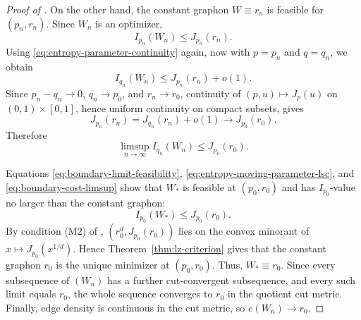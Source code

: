 \begin{proof}[Proof of ]
On the other hand, the constant graphon $W\equiv r_n$ is feasible for
$(p_n,r_n)$.  Since $W_n$ is an optimizer,
\[
  I_{p_n}(W_n)\le J_{p_n}(r_n).
\]
Using \eqref{eq:entropy-parameter-continuity} again, now with $p=p_n$ and $q=q_n$,
we obtain
\[
  I_{q_n}(W_n)
  \le
  J_{p_n}(r_n)+o(1).
\]
Since $p_n-q_n\to0$, $q_n\to p_0$, and $r_n\to r_0$, continuity of
$(p,u)\mapsto J_p(u)$ on $(0,1)\times[0,1]$, hence uniform continuity on
compact subsets, gives
\[
  J_{p_n}(r_n)=J_{q_n}(r_n)+o(1)\to J_{p_0}(r_0).
\]
Therefore
\begin{equation}\label{eq:boundary-cost-limsup}
  \limsup_{n\to\infty} I_{q_n}(W_n)
  \le
  J_{p_0}(r_0).
\end{equation}

Equations \eqref{eq:boundary-limit-feasibility}, \eqref{eq:entropy-moving-parameter-lsc}, and \eqref{eq:boundary-cost-limsup} show
that $W_*$ is feasible at $(p_0,r_0)$ and has $I_{p_0}$-value no larger than the
constant graphon:
\[
  I_{p_0}(W_*)\le J_{p_0}(r_0).
\]
By condition (M2) of ,
$(r_0^d,J_{p_0}(r_0))$ lies on the convex minorant of
$x\mapsto J_{p_0}(x^{1/d})$.  Hence
Theorem~\ref{thm:lz-criterion} gives that the constant graphon $r_0$
is the unique minimizer at $(p_0,r_0)$.  Thus,  $W_*\equiv r_0$.  Since every subsequence of $(W_n)$ has a further
cut-convergent subsequence, and every such limit equals $r_0$, the whole
sequence converges to $r_0$ in the quotient cut metric.  Finally, edge
density is continuous in the cut metric, so $e(W_n)\to r_0$.
\end{proof}


